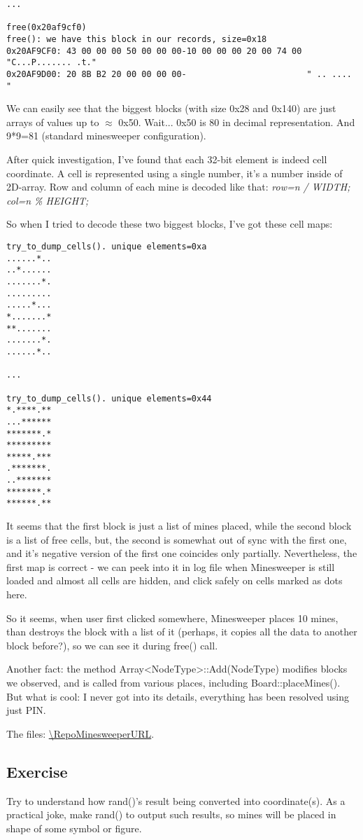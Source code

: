 \begin{lstlisting}
...

free(0x20af9cf0)
free(): we have this block in our records, size=0x18
0x20AF9CF0: 43 00 00 00 50 00 00 00-10 00 00 00 20 00 74 00 "C...P....... .t."
0x20AF9D00: 20 8B B2 20 00 00 00 00-                        " .. ....        "
\end{lstlisting}

We can easily see that the biggest blocks (with size 0x28 and 0x140) are just arrays of values up to $\approx$ 0x50.
Wait... 0x50 is 80 in decimal representation. And 9*9=81 (standard minesweeper configuration).

After quick investigation, I've found that each 32-bit element is indeed cell coordinate.
A cell is represented using a single number, it's a number inside of 2D-array.
Row and column of each mine is decoded like that: \emph{row=n / WIDTH; col=n \% HEIGHT;}

So when I tried to decode these two biggest blocks, I've got these cell maps:

\begin{lstlisting}
try_to_dump_cells(). unique elements=0xa
......*..
..*......
.......*.
.........
.....*...
*.......*
**.......
.......*.
......*..

...

try_to_dump_cells(). unique elements=0x44
*.****.**
...******
*******.*
*********
*****.***
.*******.
..*******
*******.*
******.**
\end{lstlisting}

It seems that the first block is just a list of mines placed, while the second block is a list of free cells, but, the second is somewhat out of sync with the first one,
and it's negative version of the first one coincides only partially.
Nevertheless, the first map is correct - we can peek into it in log file when Minesweeper is still loaded and almost all cells are hidden, and click safely on cells marked as dots here.

So it seems, when user first clicked somewhere, Minesweeper places 10 mines, than destroys the block with a list of it (perhaps, it copies all the data to another block before?),
so we can see it during free() call.

Another fact: the method Array<NodeType>::Add(NodeType) modifies blocks we observed, and is called from various places, including Board::placeMines().
But what is cool: I never got into its details, everything has been resolved using just PIN.

The files: \url{\RepoMinesweeperURL}.

\subsection{Exercise}

Try to understand how rand()'s result being converted into coordinate(s).
As a practical joke, make rand() to output such results, so mines will be placed in shape of some symbol or figure.

